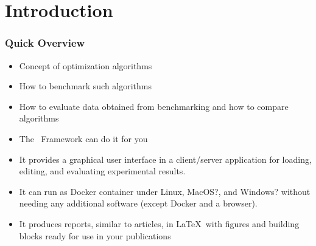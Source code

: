 %
\section{Introduction}%
%
\begin{frame}%
\frametitle{Quick Overview}%
\begin{itemize}%
\item Concept of optimization algorithms%
\item<2-> How to benchmark such algorithms%
\item<3-> How to evaluate data obtained from benchmarking and how to compare algorithms
\item<4-> The \optimizationBenchmarking\ Framework can do it for you%
\item<5-> It provides a graphical user interface in a client/server application for loading, editing, and evaluating experimental results.%
\item<6-> It can run as Docker container under Linux, MacOS?, and Windows? without needing any additional software (except Docker and a browser).%
\item<7-> It produces reports, similar to articles, in \LaTeX\ with figures and building blocks ready for use in your publications%
\end{itemize}%
\end{frame}%
%
%
